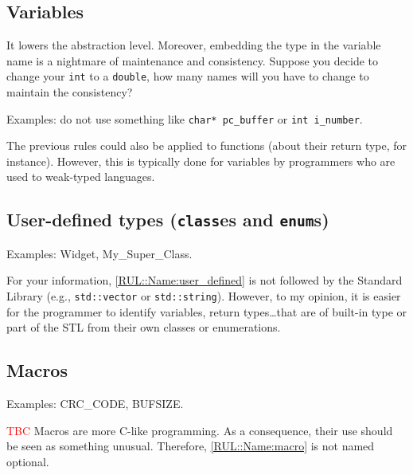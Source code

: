 	\subsection{Variables}
	
		\begin{guiderule}
			It lowers the abstraction level.
			Moreover, embedding the type in the variable name is a nightmare of maintenance and consistency.
			Suppose you decide to change your \verb|int| to a \verb|double|, how many names will you have to change to maintain the consistency? \cite{Martin_2009__Coder_propr,Stroustrup_2013__Cpp_Prog_Lang}
			
			Examples: do not use something like \verb|char* pc_buffer| or \verb|int i_number|.
		\end{guiderule}
	
		The previous rules could also be applied to functions (about their return type, for instance).
		However, this is typically done for variables by programmers who are used to weak-typed languages.


	\subsection{User-defined types (\texttt{class}es and \texttt{enum}s)}
	
		\begin{optionalrule}
			\label{RUL::Name:user_defined}
			Examples: Widget, My\_Super\_Class.
		\end{optionalrule}
	
		For your information, \cref{RUL::Name:user_defined} is not followed by the Standard Library (e.g., \verb|std::vector| or \verb|std::string|).
		However, to my opinion, it is easier for the programmer to identify variables, return types\dots that are of built-in type or part of the STL from their own classes or enumerations.
	
	
	\subsection{Macros}
	
		\begin{guiderule}
			\label{RUL::Name:macro}
			Examples: CRC\_CODE, BUFSIZE.
		\end{guiderule}
	
		\textcolor{red}{TBC}
		Macros are more C-like programming.
		As a consequence, their use should be seen as something unusual.
		Therefore, \cref{RUL::Name:macro} is not named optional.

